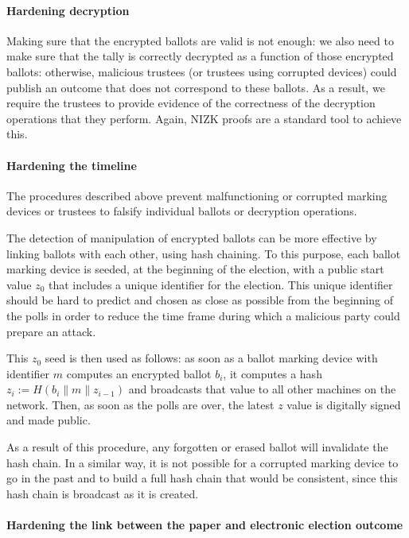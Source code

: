 \paragraph{Hardening decryption}
\label{sec:hardening-decryption}
Making sure that the encrypted ballots are valid is not enough: we
also need to make sure that the tally is correctly decrypted as a
function of those encrypted ballots: otherwise, malicious trustees (or
trustees using corrupted devices) could publish an outcome that does
not correspond to these ballots. As a result, we require the trustees
to provide evidence of the correctness of the decryption operations
that they perform.  Again, NIZK proofs are a standard tool to achieve
this.

\paragraph{Hardening the timeline}
\label{sec:hard-timeline}

The procedures described above prevent malfunctioning or corrupted
marking devices or trustees to falsify individual ballots or decryption
operations.

The detection of manipulation of encrypted ballots can be more
effective by linking ballots with each other, using hash chaining.  To
this purpose, each ballot marking device is seeded, at the beginning
of the election, with a public start value $z_0$ that includes a
unique identifier for the election. This unique identifier should be
hard to predict and chosen as close as possible from the beginning of
the polls in order to reduce the time frame during which a malicious
party could prepare an attack.

This $z_0$ seed is then used as follows: as soon as a ballot marking
device with identifier $m$ computes an encrypted ballot $b_i$, it
computes a hash $z_i := H(b_i \| m \| z_{i-1})$ and broadcasts that
value to all other machines on the network. Then, as soon as the polls
are over, the latest $z$ value is digitally signed and made public.

As a result of this procedure, any forgotten or erased ballot will
invalidate the hash chain. In a similar way, it is not possible for a
corrupted marking device to go in the past and to build a full hash
chain that would be consistent, since this hash chain is broadcast as
it is created.

\paragraph{Hardening the link between the paper and electronic
  election outcome}
\label{sec:hard-link-betw}

